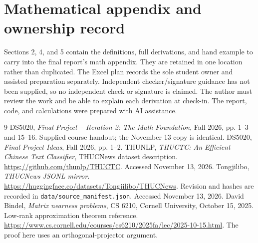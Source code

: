 \documentclass[11pt]{article}
\begin{document}
\appendix
\section{Mathematical appendix and ownership record}
Sections 2, 4, and 5 contain the definitions, full derivations, and hand example to
carry into the final report's math appendix. They are retained in one location
rather than duplicated. The Excel plan records the sole student owner and
assisted preparation separately. Independent checker/signature guidance has not
been supplied, so no independent check or signature is claimed. The author must
review the work and be able to explain each derivation at check-in. The report,
code, and calculations were prepared with AI assistance.

\begin{thebibliography}{9}
 DS5020, \emph{Final Project -- Iteration 2: The Math Foundation},
Fall 2026, pp. 1--3 and 15--16. Supplied course handout; the November 13 copy is identical.
 DS5020, \emph{Final Project Ideas}, Fall 2026, pp. 1--2.
 THUNLP, \emph{THUCTC: An Efficient Chinese Text Classifier},
THUCNews dataset description. \url{https://github.com/thunlp/THUCTC}.
Accessed November 13, 2026.
 Tongjilibo, \emph{THUCNews JSONL mirror}.
\url{https://huggingface.co/datasets/Tongjilibo/THUCNews}.
Revision and hashes are recorded in \texttt{data/source\_manifest.json}.
Accessed November 13, 2026.
 David Bindel, \emph{Matrix nearness problems}, CS 6210,
Cornell University, October 15, 2025. Low-rank approximation theorem reference.
\url{https://www.cs.cornell.edu/courses/cs6210/2025fa/lec/2025-10-15.html}.
The proof here uses an orthogonal-projector argument.
\end{thebibliography}
\end{document}
